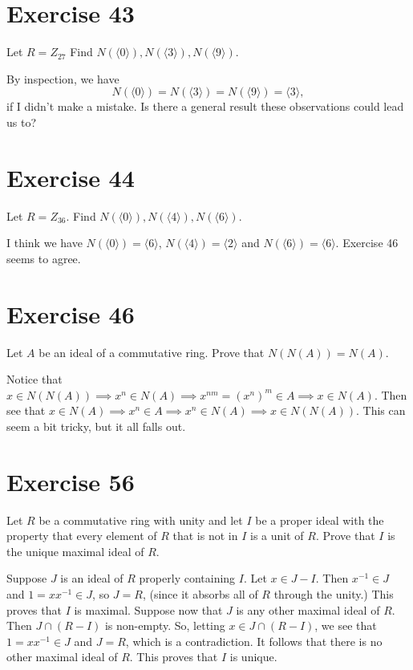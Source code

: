 \documentclass[12pt]{article}
\begin{document}
\section*{Exercise 43}

Let $R=Z_{27}$  Find $N(\langle 0\rangle), N(\langle 3\rangle), N(\langle 9\rangle)$.

By inspection, we have
\begin{equation*}
N(\langle 0\rangle)=N(\langle 3\rangle)=N(\langle 9\rangle)=\langle 3\rangle,
\end{equation*}
if I didn't make a mistake.  Is there a general result these observations could
lead us to?

\section*{Exercise 44}

Let $R=Z_{36}$.  Find $N(\langle 0\rangle), N(\langle 4\rangle), N(\langle 6\rangle)$.

I think we have $N(\langle 0\rangle)=\langle 6\rangle$, $N(\langle 4\rangle)=\langle 2\rangle$
and $N(\langle 6\rangle)=\langle 6\rangle$.  Exercise 46 seems to agree.

\section*{Exercise 46}

Let $A$ be an ideal of a commutative ring.  Prove that $N(N(A))=N(A)$.

Notice that $x\in N(N(A))\implies x^n\in N(A)\implies x^{nm}=(x^n)^m\in A\implies x\in N(A)$.
Then see that $x\in N(A)\implies x^n\in A\implies x^n \in N(A)\implies x\in N(N(A))$.
This can seem a bit tricky, but it all falls out.

\section*{Exercise 56}

Let $R$ be a commutative ring with unity and let $I$ be a proper ideal with the
property that every element of $R$ that is not in $I$ is a unit of $R$.  Prove
that $I$ is the unique maximal ideal of $R$.

Suppose $J$ is an ideal of $R$ properly containing $I$.
Let $x\in J-I$.  Then $x^{-1}\in J$ and $1=xx^{-1}\in J$,
so $J=R$, (since it absorbs all of $R$ through the unity.)  This proves that $I$ is maximal.
Suppose now that $J$ is any other maximal ideal of $R$.
Then $J\cap (R-I)$ is non-empty.  So, letting $x\in J\cap (R-I)$,
we see that $1=xx^{-1}\in J$ and $J=R$, which is a contradiction.
It follows that there is no other maximal ideal of $R$.  This
proves that $I$ is unique.
\end{document}
